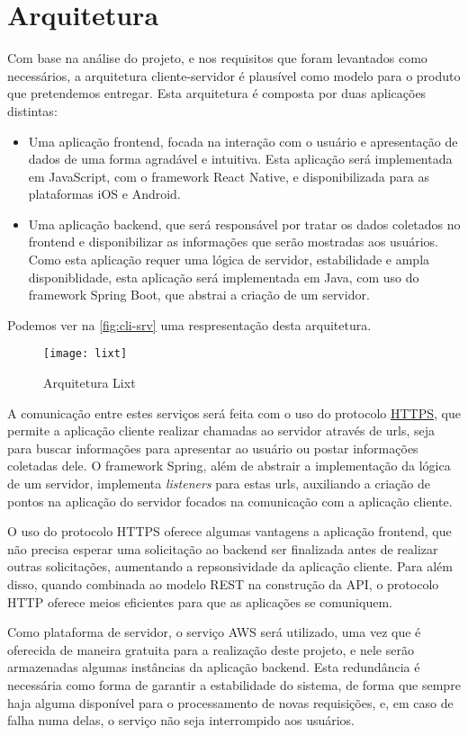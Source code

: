 \section{Arquitetura}

Com base na análise do projeto, e nos requisitos que foram levantados
como necessários, a arquitetura cliente-servidor é plausível como
modelo para o produto que pretendemos entregar.
Esta arquitetura é composta por duas aplicações distintas:
\begin{itemize}
\item Uma aplicação \gls{frontend}, focada na interação com o usuário
  e apresentação de dados de uma forma agradável e intuitiva. Esta
  aplicação será implementada em JavaScript, com o \gls{framework} React
  Native, e disponibilizada para as plataformas iOS e Android.
\item Uma aplicação \gls{backend}, que será responsável por tratar os
  dados coletados no \gls{frontend} e disponibilizar as informações
  que serão mostradas aos usuários. Como esta aplicação requer uma
  lógica de servidor, estabilidade e ampla disponiblidade, esta
  aplicação será implementada em Java, com uso do \gls{framework} Spring
  Boot, que abstrai a criação de um servidor.
\end{itemize}
Podemos ver na \autoref{fig:cli-srv} uma respresentação desta
arquitetura.

\begin{figure}[H]
  \centering
  \caption{Arquitetura Lixt}
  \label{fig:cli-srv}
  \texttt{[image: lixt]}
\end{figure}

A comunicação entre estes serviços será feita com o uso do protocolo
\label{sig:https}\hyperlink{s:http}{HTTPS}, que permite a aplicação
cliente realizar chamadas ao servidor através de urls, seja para
buscar informações para apresentar ao usuário ou postar informações
coletadas dele. O \gls{framework} Spring, além de abstrair a implementação
da lógica de um servidor, implementa \emph{listeners} para estas urls,
auxiliando a criação de pontos na aplicação do servidor focados na
comunicação com a aplicação cliente.

O uso do protocolo HTTPS oferece algumas vantagens a aplicação
\gls{frontend}, que não precisa esperar uma solicitação ao
\gls{backend} ser finalizada antes de realizar outras solicitações,
aumentando a repsonsividade da aplicação cliente. Para além disso,
quando combinada ao modelo \label{sig:rest}\gls{REST} na
construção da \label{sig:API}\gls{API}, o protocolo HTTP
oferece meios eficientes para que as aplicações se comuniquem.

Como plataforma de servidor, o serviço AWS será utilizado, uma vez que
é oferecida de maneira gratuita para a realização deste projeto, e nele
serão armazenadas algumas instâncias da aplicação \gls{backend}.
Esta redundância é necessária como forma de garantir a estabilidade do
sistema, de forma que sempre haja alguma disponível para o
processamento de novas requisições, e, em caso de falha numa delas, o
serviço não seja interrompido aos usuários.

